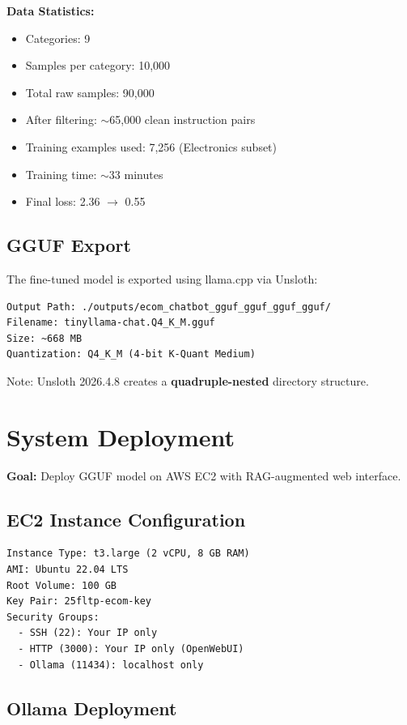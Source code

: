 \documentclass[12pt,a4paper]{article}
\begin{document}
\textbf{Data Statistics:}
\begin{itemize}
    \item Categories: 9
    \item Samples per category: 10,000
    \item Total raw samples: 90,000
    \item After filtering: $\sim$65,000 clean instruction pairs
    \item Training examples used: 7,256 (Electronics subset)
    \item Training time: $\sim$33 minutes
    \item Final loss: 2.36 $\rightarrow$ 0.55
\end{itemize}

\subsection{GGUF Export}

The fine-tuned model is exported using llama.cpp via Unsloth:

\begin{verbatim}
Output Path: ./outputs/ecom_chatbot_gguf_gguf_gguf_gguf/
Filename: tinyllama-chat.Q4_K_M.gguf
Size: ~668 MB
Quantization: Q4_K_M (4-bit K-Quant Medium)
\end{verbatim}

Note: Unsloth 2026.4.8 creates a \textbf{quadruple-nested} directory structure.

\section{System Deployment}
\label{sec:person3}

\textbf{Goal:} Deploy GGUF model on AWS EC2 with RAG-augmented web interface.

\subsection{EC2 Instance Configuration}

\begin{verbatim}
Instance Type: t3.large (2 vCPU, 8 GB RAM)
AMI: Ubuntu 22.04 LTS
Root Volume: 100 GB
Key Pair: 25fltp-ecom-key
Security Groups:
  - SSH (22): Your IP only
  - HTTP (3000): Your IP only (OpenWebUI)
  - Ollama (11434): localhost only
\end{verbatim}

\subsection{Ollama Deployment}
\end{document}
